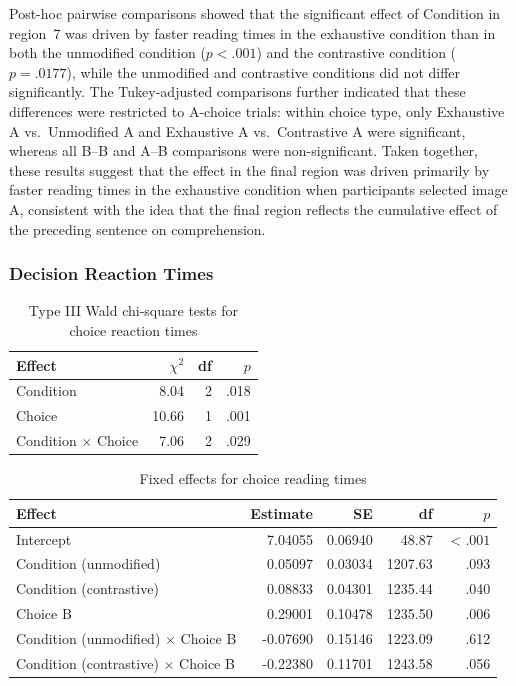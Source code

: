 \documentclass[ruler]{CUP-JNL-LIN}%
\begin{document}
Post-hoc pairwise comparisons showed that the significant effect of Condition in region~7 was driven by faster reading times in the exhaustive condition than in both the unmodified condition ($p<.001$) and the contrastive condition ($p=.0177$), while the unmodified and contrastive conditions did not differ significantly. The Tukey-adjusted comparisons further indicated that these differences were restricted to A-choice trials: within choice type, only Exhaustive A vs.\ Unmodified A and Exhaustive A vs.\ Contrastive A were significant, whereas all B--B and A--B comparisons were non-significant. Taken together, these results suggest that the effect in the final region was driven primarily by faster reading times in the exhaustive condition when participants selected image A, consistent with the idea that the final region reflects the cumulative effect of the preceding sentence on comprehension.



\subsubsection{Decision Reaction Times}

\begin{table}[htbp]
\centering
\caption{Type III Wald chi-square tests for choice reaction times}
\label{tab:choice-rt}
\begin{tabularx}{\textwidth}{@{}Xrrr@{}}
\toprule
Effect & $\chi^2$ & df & $p$ \\
\midrule
Condition & 8.04 & 2 & .018 \\
Choice & 10.66 & 1 & .001 \\
Condition $\times$ Choice & 7.06 & 2 & .029 \\
\bottomrule
\end{tabularx}
\end{table}

\begin{table}[htbp]
\centering
\caption{Fixed effects for choice reading times}
\label{tab:choice-rt-fixed}
\begin{tabularx}{\textwidth}{@{}Xrrrr@{}}
\toprule
Effect & Estimate & SE & df & $p$ \\
\midrule
Intercept & 7.04055 & 0.06940 & 48.87 & $< .001$ \\
Condition (unmodified) & 0.05097 & 0.03034 & 1207.63 & .093 \\
Condition (contrastive) & 0.08833 & 0.04301 & 1235.44 & .040 \\
Choice B & 0.29001 & 0.10478 & 1235.50 & .006 \\
Condition (unmodified) $\times$ Choice B & -0.07690 & 0.15146 & 1223.09 & .612 \\
Condition (contrastive) $\times$ Choice B & -0.22380 & 0.11701 & 1243.58 & .056 \\
\bottomrule
\end{tabularx}
\end{table}
\end{document}

